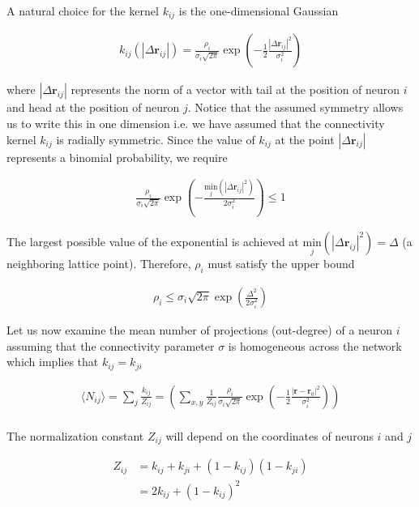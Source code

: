 \documentclass{ucetd}
\begin{document}
A natural choice for the kernel $k_{ij}$ is the one-dimensional Gaussian

\begin{align*}
k_{ij}(|\Delta\mathbf{r}_{ij}|) = \frac{\rho_{i}}{\sigma_{i}\sqrt{2\pi}}\exp\left(-\frac{1}{2}\frac{|\Delta\mathbf{r}_{ij}|^{2}}{\sigma_{i}^{2}} \right)
\end{align*}

where $|\Delta\mathbf{r}_{ij}|$ represents the norm of a vector with tail at the position of neuron $i$ and head at the position of neuron $j$. Notice that the assumed symmetry allows us to write this in one dimension i.e. we have assumed that the connectivity kernel $k_{ij}$ is radially symmetric. Since the value of $k_{ij}$ at the point $|\Delta\mathbf{r}_{ij}|$ represents a binomial probability, we require


\begin{align*}
\frac{\rho_{i}}{\sigma_{i}\sqrt{2\pi}}\exp\left(-\frac{\underset{j}{\mathrm{min}}\left(|\Delta\mathbf{r}_{ij}|^{2}\right)}{2\sigma_{i}^{2}} \right) \leq 1
\end{align*}

The largest possible value of the exponential is achieved at $\underset{j}{\mathrm{min}}\left(|\Delta\mathbf{r}_{ij}|^{2}\right) = \Delta$ (a neighboring lattice point). Therefore, $\rho_{i}$ must satisfy the upper bound

\begin{align*}
\rho_{i} \leq \sigma_{i}\sqrt{2\pi}\exp\left(\frac{\Delta^{2}}{2\sigma_{i}^{2}}\right)
\end{align*}

Let us now examine the mean number of projections (out-degree) of a neuron $i$ assuming that the connectivity parameter $\sigma$ is homogeneous across the network which implies that $k_{ij} = k_{ji}$

\begin{align*}
\langle N_{ij} \rangle = \sum_{j} \frac{k_{ij}}{Z_{ij}} = \left(\sum_{x,y} \frac{1}{Z_{ij}}\frac{\rho_{i}}{\sigma_{i}\sqrt{2\pi}}\exp\left(-\frac{1}{2}\frac{|\mathbf{r}-\mathbf{r}_{0}|^{2}}{\sigma_{i}^{2}} \right)\right)\\
\end{align*}

The normalization constant $Z_{ij}$ will depend on the coordinates of neurons $i$ and $j$

\begin{align*}
Z_{ij} &= k_{ij} + k_{ji} + (1-k_{ij})(1-k_{ji})\\
&= 2k_{ij} + (1-k_{ij})^{2}
\end{align*}
\end{document}
